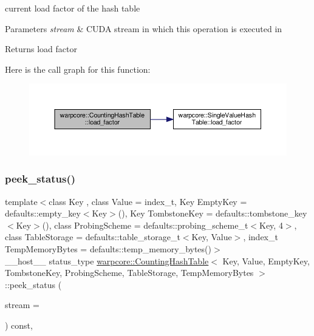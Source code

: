 current load factor of the hash table 


\begin{DoxyParams}{Parameters}
{\em stream} & C\+U\+DA stream in which this operation is executed in \\
\hline
\end{DoxyParams}
\begin{DoxyReturn}{Returns}
load factor 
\end{DoxyReturn}
Here is the call graph for this function\+:
\nopagebreak
\begin{figure}[H]
\begin{center}
\leavevmode
\includegraphics[width=350pt]{classwarpcore_1_1CountingHashTable_ad4a829b15a3add41133437c17ab6bf67_cgraph}
\end{center}
\end{figure}
\mbox{\label{classwarpcore_1_1CountingHashTable_ae9e388f29dae1952c2da7fed32415e35}} 
\subsubsection{\texorpdfstring{peek\+\_\+status()}{peek\_status()}}
{\footnotesize\ttfamily template$<$class Key , class Value  = index\+\_\+t, Key Empty\+Key = defaults\+::empty\+\_\+key$<$\+Key$>$(), Key Tombstone\+Key = defaults\+::tombstone\+\_\+key$<$\+Key$>$(), class Probing\+Scheme  = defaults\+::probing\+\_\+scheme\+\_\+t$<$\+Key, 4$>$, class Table\+Storage  = defaults\+::table\+\_\+storage\+\_\+t$<$\+Key, Value$>$, index\+\_\+t Temp\+Memory\+Bytes = defaults\+::temp\+\_\+memory\+\_\+bytes()$>$ \\
\+\_\+\+\_\+host\+\_\+\+\_\+ status\+\_\+type \hyperlink{classwarpcore_1_1CountingHashTable}{warpcore\+::\+Counting\+Hash\+Table}$<$ Key, Value, Empty\+Key, Tombstone\+Key, Probing\+Scheme, Table\+Storage, Temp\+Memory\+Bytes $>$\+::peek\+\_\+status (\begin{DoxyParamCaption}\item[{cuda\+Stream\+\_\+t}]{stream = {} }\end{DoxyParamCaption}) const\hspace{0.3cm}{\ttfamily [inline]}, {\ttfamily [noexcept]}}



